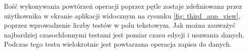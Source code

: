 Ilość wykonywania powtórzeń operacji poprzez pętle zostaje zdefiniowana przez użytkownika w ekranie aplikacji widocznym na rysunku \ref{fig: third_app_view}, poprzez wprowadzenie liczby testów w polu tekstowym. Jak można zauważyć najbardziej czasochłonnymi testami jest pomiar czasu edycji i usuwania danych. Podczas tego testu wielokrotnie jest powtarzana operacja zapisu do danych.  